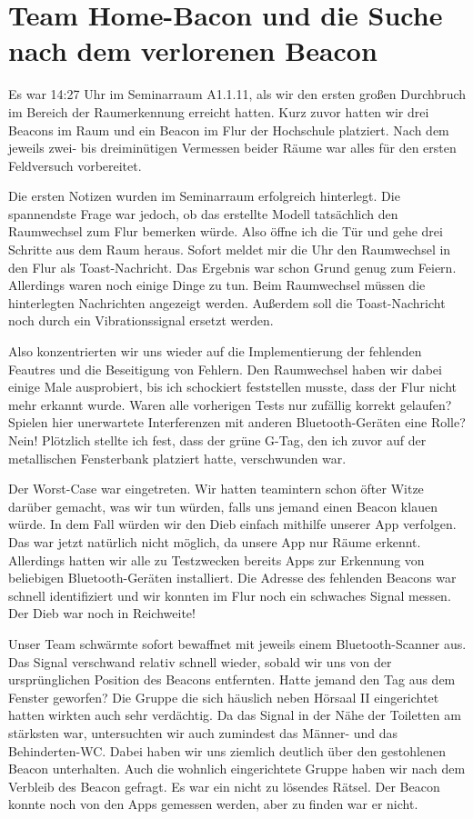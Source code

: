 \section{Team Home-Bacon und die Suche nach dem verlorenen Beacon}

Es war 14:27 Uhr im Seminarraum A1.1.11, als wir den ersten großen Durchbruch
im Bereich der Raumerkennung erreicht hatten. Kurz zuvor hatten wir drei Beacons
im Raum und ein Beacon im Flur der Hochschule platziert. Nach dem jeweils
zwei- bis dreiminütigen Vermessen beider Räume war alles für den ersten
Feldversuch vorbereitet.

Die ersten Notizen wurden im Seminarraum erfolgreich hinterlegt. Die spannendste
Frage war jedoch, ob das erstellte Modell tatsächlich den Raumwechsel zum Flur 
bemerken würde. Also öffne ich die Tür und gehe drei Schritte aus dem Raum heraus.
Sofort meldet mir die Uhr den Raumwechsel in den Flur als Toast-Nachricht. Das 
Ergebnis war schon Grund genug zum Feiern. Allerdings waren noch einige Dinge
zu tun. Beim Raumwechsel müssen die hinterlegten Nachrichten angezeigt werden.
Außerdem soll die Toast-Nachricht noch durch ein Vibrationssignal ersetzt werden.

Also konzentrierten wir uns wieder auf die Implementierung der fehlenden
Feautres und die Beseitigung von Fehlern. Den Raumwechsel haben wir dabei einige
Male ausprobiert, bis ich schockiert feststellen musste, dass der Flur nicht
mehr erkannt wurde. Waren alle vorherigen Tests nur zufällig korrekt gelaufen?
Spielen hier unerwartete Interferenzen mit anderen Bluetooth-Geräten eine Rolle?
Nein! Plötzlich stellte ich fest, dass der grüne G-Tag, den ich zuvor auf der
metallischen Fensterbank platziert hatte, verschwunden war.

Der Worst-Case war eingetreten. Wir hatten teamintern schon öfter Witze darüber
gemacht, was wir tun würden, falls uns jemand einen Beacon klauen würde.
In dem Fall würden wir den Dieb einfach mithilfe unserer App verfolgen.
Das war jetzt natürlich nicht möglich, da unsere App nur Räume erkennt.
Allerdings hatten wir alle zu Testzwecken bereits Apps zur Erkennung von
beliebigen Bluetooth-Geräten installiert. Die Adresse des fehlenden Beacons
war schnell identifiziert und wir konnten im Flur noch ein schwaches Signal
messen. Der Dieb war noch in Reichweite!

Unser Team schwärmte sofort bewaffnet mit jeweils einem Bluetooth-Scanner aus.
Das Signal verschwand relativ schnell wieder, sobald wir uns von der ursprünglichen
Position des Beacons entfernten. Hatte jemand den Tag aus dem Fenster geworfen?
Die Gruppe die sich häuslich neben Hörsaal II eingerichtet hatten wirkten auch
sehr verdächtig. Da das Signal in der Nähe der Toiletten am stärksten war,
untersuchten wir auch zumindest das Männer- und das Behinderten-WC. Dabei haben wir
uns ziemlich deutlich über den gestohlenen Beacon unterhalten. Auch die
wohnlich eingerichtete Gruppe haben wir nach dem Verbleib des Beacon gefragt.
Es war ein nicht zu lösendes Rätsel. Der Beacon konnte noch von den Apps gemessen
werden, aber zu finden war er nicht.

